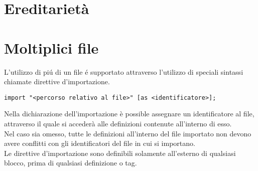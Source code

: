 \section{Ereditarietà}

\section{Moltiplici file} \label{MultipleFiles}
L'utilizzo di piú di un file é supportato attraverso l'utilizzo di speciali sintassi
chiamate direttive d'importazione. 
\begin{lstlisting}
import "<percorso relativo al file>" [as <identificatore>];
\end{lstlisting}
Nella dichiarazione dell'importazione è possible assegnare un identificatore al file, 
attraverso il quale si accederà alle definizioni contenute all'interno di esso. \\
Nel caso sia omesso, tutte le definizioni all'interno del file importato non devono avere
conflitti con gli identificatori del file in cui si importano. \\
Le direttive d'importazione sono definibili solamente all'esterno di qualsiasi blocco,
prima di qualsiasi definizione o tag. 







